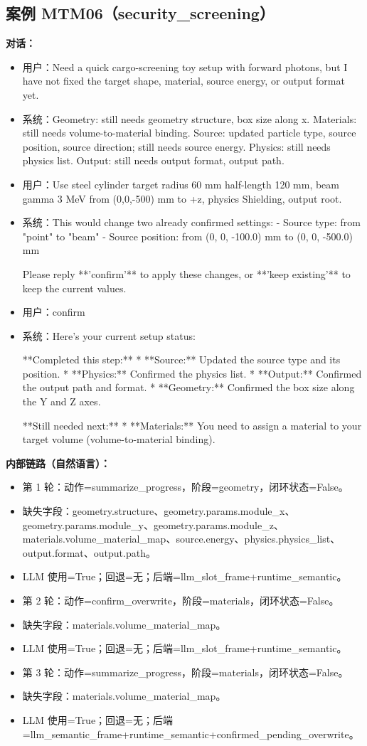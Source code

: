 \documentclass[11pt]{ctexart}
\begin{document}
\subsection{案例 MTM06（security\_screening）}
\textbf{对话：}
\begin{itemize}
\item 用户：Need a quick cargo-screening toy setup with forward photons, but I have not fixed the target shape, material, source energy, or output format yet.
\item 系统：Geometry: still needs geometry structure, box size along x. Materials: still needs volume-to-material binding. Source: updated particle type, source position, source direction; still needs source energy. Physics: still needs physics list. Output: still needs output format, output path.
\item 用户：Use steel cylinder target radius 60 mm half-length 120 mm, beam gamma 3 MeV from (0,0,-500) mm to +z, physics Shielding, output root.
\item 系统：This would change two already confirmed settings:
- Source type: from "point" to "beam"
- Source position: from (0, 0, -100.0) mm to (0, 0, -500.0) mm

Please reply **'confirm'** to apply these changes, or **'keep existing'** to keep the current values.
\item 用户：confirm
\item 系统：Here's your current setup status:

**Completed this step:**
*   **Source:** Updated the source type and its position.
*   **Physics:** Confirmed the physics list.
*   **Output:** Confirmed the output path and format.
*   **Geometry:** Confirmed the box size along the Y and Z axes.

**Still needed next:**
*   **Materials:** You need to assign a material to your target volume (volume-to-material binding).
\end{itemize}
\textbf{内部链路（自然语言）：}
\begin{itemize}
\item 第 1 轮：动作=summarize\_progress，阶段=geometry，闭环状态=False。
\item 缺失字段：geometry.structure、geometry.params.module\_x、geometry.params.module\_y、geometry.params.module\_z、materials.volume\_material\_map、source.energy、physics.physics\_list、output.format、output.path。
\item LLM 使用=True；回退=无；后端=llm\_slot\_frame+runtime\_semantic。
\item 第 2 轮：动作=confirm\_overwrite，阶段=materials，闭环状态=False。
\item 缺失字段：materials.volume\_material\_map。
\item LLM 使用=True；回退=无；后端=llm\_slot\_frame+runtime\_semantic。
\item 第 3 轮：动作=summarize\_progress，阶段=materials，闭环状态=False。
\item 缺失字段：materials.volume\_material\_map。
\item LLM 使用=True；回退=无；后端=llm\_semantic\_frame+runtime\_semantic+confirmed\_pending\_overwrite。
\end{itemize}
\end{document}
